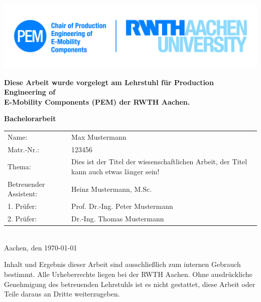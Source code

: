 




\begin{titlepage}
\flushright
\vspace*{-2.3cm}
{
\includegraphics[scale=0.7]{figs/pem_logo.png}}
\\
\centering
\vspace{0.5cm}
\begin{doublespacing}
	\textbf{Diese Arbeit wurde vorgelegt am Lehrstuhl für Production Engineering of\\ E-Mobility Components (PEM) der RWTH Aachen.}\\
\end{doublespacing}
\vspace{1.5cm}
\textbf{\LARGE Bachelorarbeit}
\\
\flushleft
\vspace{1.7cm}
\Large
\begin{tabular}{lp{10cm}}
	\rule[-2ex]{0pt}{2.5ex} Name: & Max Mustermann \\ 
	\rule[-6ex]{0pt}{2.5ex} Matr.-Nr.: & 123456 \\ 
	\rule[-16ex]{0pt}{2.5ex} Thema: & Dies ist der Titel der wissenschaftlichen Arbeit, der Titel kann auch etwas länger sein! \\ 
	\rule[-6ex]{0pt}{2.5ex} Betreuender Assistent: & Heinz Mustermann, M.Sc. \\ 
	\rule[-2ex]{0pt}{2.5ex} 1. Prüfer: & Prof. Dr.-Ing. Peter Mustermann \\ 
	\rule[-2ex]{0pt}{2.5ex} 2. Prüfer: & Dr.-Ing. Thomas Mustermann \\ 
\end{tabular} 
\\
\vspace{1.2cm}
\hspace{0.15cm}
Aachen, den \today
\\
\vspace{1.4cm}
\hspace{0.15cm}
\begin{minipage}{0.98\textwidth}
	\large
	Inhalt und Ergebnis dieser Arbeit sind ausschließlich zum internen Gebrauch\\ bestimmt. Alle Urheberrechte liegen bei der RWTH Aachen. Ohne ausdrückliche\\ Genehmigung des betreuenden Lehrstuhls ist es nicht gestattet, diese Arbeit oder Teile daraus an Dritte weiterzugeben.
\end{minipage}
\end{titlepage}	
\newpage
\thispagestyle{empty} %
\mbox{}

